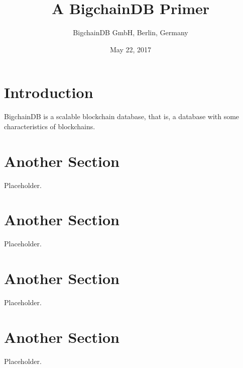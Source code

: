 \documentclass[a4paper]{article}
\title{A BigchainDB Primer}
\author{BigchainDB GmbH, Berlin, Germany}
\date{May 22, 2017}
\begin{document}

\maketitle

\section{Introduction}

BigchainDB is a scalable blockchain database, that is, a database with some characteristics of blockchains.

\section{Another Section}

Placeholder.

\section{Another Section}

Placeholder.

\section{Another Section}

Placeholder.

\section{Another Section}

Placeholder.
\end{document}
